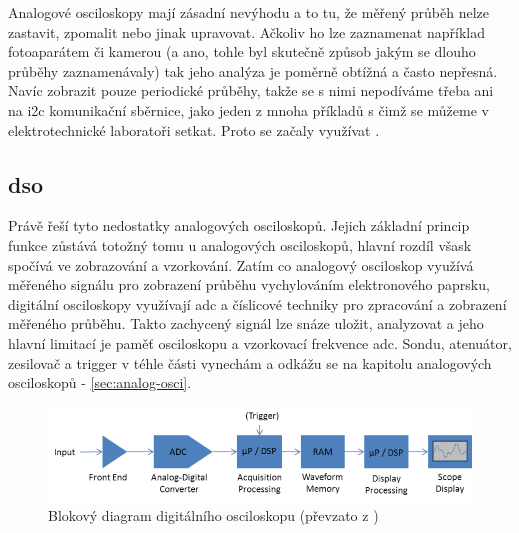 \documentclass[12pt]{article}
\begin{document}
Analogové osciloskopy mají zásadní nevýhodu
a to tu, že měřený průběh nelze zastavit, zpomalit nebo jinak upravovat. Ačkoliv ho lze
zaznamenat například fotoaparátem či kamerou (a ano, tohle byl skutečně způsob jakým se
dlouho průběhy zaznamenávaly) tak jeho analýza je poměrně obtížná a často nepřesná.
Navíc zobrazit pouze periodické průběhy, takže se s nimi nepodíváme třeba ani na
\gls{i2c} komunikační sběrnice, jako jeden z mnoha příkladů s čimž se můžeme v elektrotechnické
laboratoři setkat. Proto se začaly využívat .

\subsection{\Acrfull{dso}}

Právě  řeší tyto nedostatky analogových osciloskopů. Jejich základní princip
funkce zůstává totožný tomu u analogových osciloskopů, hlavní rozdíl všask spočívá ve zobrazování
a vzorkování. Zatím co analogový osciloskop využívá měřeného signálu pro zobrazení průběhu
vychylováním elektronového paprsku, digitální osciloskopy využívají \acrfull{adc} a
číslicové techniky pro zpracování a zobrazení měřeného průběhu. Takto zachycený signál
lze snáze uložit, analyzovat a jeho hlavní limitací je paměť osciloskopu a vzorkovací frekvence
\acrshort{adc}. Sondu, atenuátor, zesilovač a trigger v téhle části vynechám a odkážu se na
kapitolu analogových osciloskopů - \ref{sec:analog-osci}.

\begin{figure}[h]
    \centering
    \includegraphics[width=\textwidth]{digital-oscilloscope-diagram}
    \caption{Blokový diagram digitálního osciloskopu (převzato z \cite{SampleProcessingDigital})}
    \label{fig:blok-digital-osci}
\end{figure}
\end{document}
